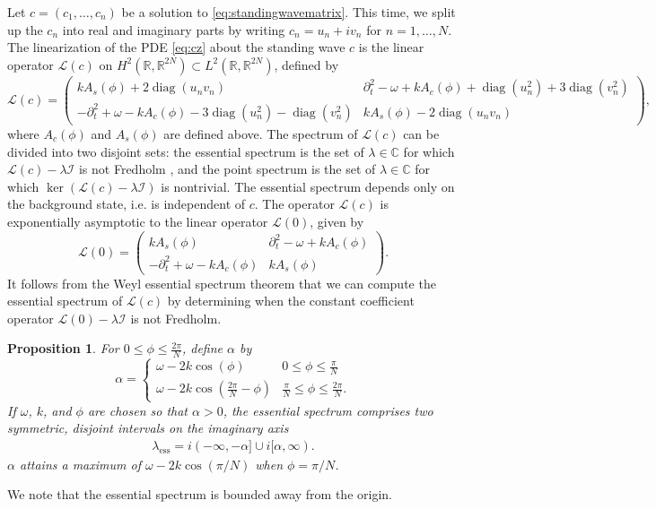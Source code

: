 \documentclass[11pt,reqno]{amsart}
\def\R{{\mathbb R}}
\def\C{{\mathbb C}}
\def\calI{{\mathcal I}}
\def\calL{{\mathcal L}}
\DeclareMathOperator{\diag}{diag}
\newtheorem{proposition}{Proposition}
\begin{document}
Let $c = (c_1, \dots, c_n)$ be a solution to \cref{eq:standingwavematrix}. This time, we split up the $c_n$ into real and imaginary parts by writing $c_n = u_n + i v_n$ for $n = 1, \dots, N$. The linearization of the PDE \cref{eq:cz} about the standing wave $c$ is the linear operator $\calL(c)$ on $H^2(\R, \R^{2N}) \subset L^2(\R, \R^{2N})$, defined by 
\begin{equation}\label{eq:linc}
\calL(c) = \begin{pmatrix}
k A_s(\phi) + 2 \diag(u_n v_n) & \partial_t^2 - \omega + k A_c(\phi) + \diag(u_n^2) + 3 \diag(v_n^2) \\
-\partial_t^2 + \omega - k A_c(\phi) - 3\diag(u_n^2) - \diag(v_n^2) &
k A_s(\phi) - 2 \diag(u_n v_n)
\end{pmatrix},
\end{equation}
where $A_c(\phi)$ and $A_s(\phi)$ are defined above. The spectrum of $\calL(c) $ can be divided into two disjoint sets: the essential spectrum is the set of $\lambda \in \C$ for which $\calL(c) - \lambda \calI$ is not Fredholm \cite[Section 3.1]{Kapitula2013}, and the point spectrum is the set of $\lambda \in \C$ for which $\ker( \calL(c) - \lambda \calI)$ is nontrivial. The essential spectrum depends only on the background state, i.e. is independent of $c$. The operator $\calL(c)$ is exponentially asymptotic to the linear operator $\calL(0)$, given by
\begin{equation}\label{eq:L0}
\calL(0) = \begin{pmatrix}
k A_s(\phi) & \partial_t^2 - \omega + k A_c(\phi)  \\
-\partial_t^2 + \omega - k A_c(\phi) &
k A_s(\phi) 
\end{pmatrix}.
\end{equation}
It follows from the Weyl essential spectrum theorem \cite[Theorem 2.2.6]{Kapitula2013} that we can compute the essential spectrum of $\calL(c)$ by determining when the constant coefficient operator $\calL(0)-\lambda \calI$ is not Fredholm. 

\begin{proposition}\label{prop:ess}
For $0 \leq \phi \leq \frac{2\pi}{N}$, define $\alpha$ by 
\begin{equation}\label{eq:essalpha}
\alpha = \begin{cases}
\omega - 2 k \cos\left(\phi\right) & 0 \leq \phi \leq \frac{\pi}{N} \\
\omega - 2 k \cos\left(\frac{2\pi}{N}-\phi\right) & \frac{\pi}{N} \leq \phi \leq \frac{2\pi}{N}.
\end{cases}
\end{equation}
If $\omega$, $k$, and $\phi$ are chosen so that $\alpha > 0$, the essential spectrum comprises two symmetric, disjoint intervals on the imaginary axis
\begin{align}\label{eq:lessinterval}
\lambda_{\text{ess}} = i (-\infty, -\alpha] \cup i [\alpha, \infty).
\end{align}
$\alpha$ attains a maximum of $\omega - 2 k \cos\left(\pi/N\right)$ when $\phi = \pi/N$.
\end{proposition}
We note that the essential spectrum is bounded away from the origin.
\end{document}
